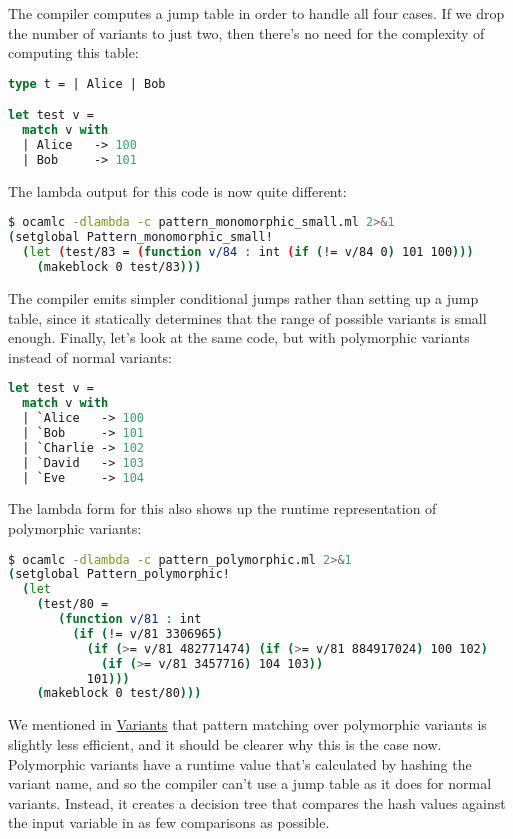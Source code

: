 The compiler computes a jump table in order to handle all four cases. If
we drop the number of variants to just two, then there's no need for the
complexity of computing this table:

\begin{lstlisting}[language=Caml]
type t = | Alice | Bob

let test v =
  match v with
  | Alice   -> 100
  | Bob     -> 101
\end{lstlisting}

The lambda output for this code is now quite different:

\begin{lstlisting}[language=bash]
$ ocamlc -dlambda -c pattern_monomorphic_small.ml 2>&1
(setglobal Pattern_monomorphic_small!
  (let (test/83 = (function v/84 : int (if (!= v/84 0) 101 100)))
    (makeblock 0 test/83)))
\end{lstlisting}

The compiler emits simpler conditional jumps rather than setting up a
jump table, since it statically determines that the range of possible
variants is small enough. Finally, let's look at the same code, but with
polymorphic variants instead of normal variants:

\begin{lstlisting}[language=Caml]
let test v =
  match v with
  | `Alice   -> 100
  | `Bob     -> 101
  | `Charlie -> 102
  | `David   -> 103
  | `Eve     -> 104
\end{lstlisting}

The lambda form for this also shows up the runtime representation of
polymorphic variants:

\begin{lstlisting}[language=bash]
$ ocamlc -dlambda -c pattern_polymorphic.ml 2>&1
(setglobal Pattern_polymorphic!
  (let
    (test/80 =
       (function v/81 : int
         (if (!= v/81 3306965)
           (if (>= v/81 482771474) (if (>= v/81 884917024) 100 102)
             (if (>= v/81 3457716) 104 103))
           101)))
    (makeblock 0 test/80)))
\end{lstlisting}

We mentioned in \href{variants.html\#variants}{Variants} that pattern
matching over polymorphic variants is slightly less efficient, and it
should be clearer why this is the case now. Polymorphic variants have a
runtime value that's calculated by hashing the variant name, and so the
compiler can't use a jump table as it does for normal variants. Instead,
it creates a decision tree that compares the hash values against the
input variable in as few comparisons as possible.

